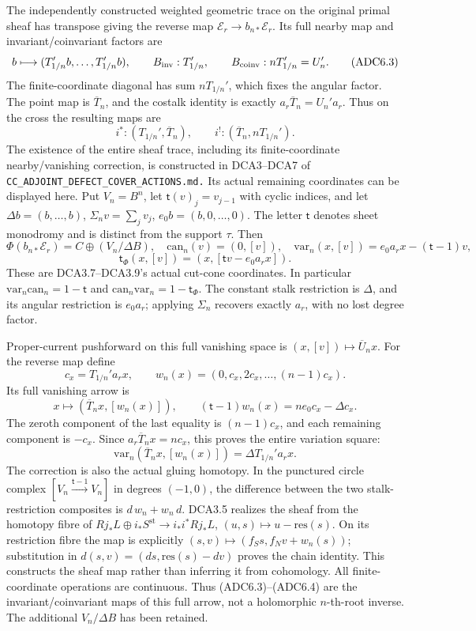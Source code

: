 The independently constructed weighted geometric trace on the original
primal sheaf has transpose giving the reverse map
\(\mathscr E_r\to b_{n*}\mathscr E_r\). Its full nearby map and
invariant/coinvariant factors are \[
b\longmapsto(T_{1/n}'b,\ldots,T_{1/n}'b),\qquad
B_{\rm inv}:T_{1/n}',\qquad B_{\rm coinv}:nT_{1/n}'=U_n'.
\tag{ADC6.3}
\] The finite-coordinate diagonal has sum \(nT_{1/n}'\), which fixes the
angular factor. The point map is \(\overline T_n\), and the costalk
identity is exactly \(a_r\overline T_n=U_n'a_r\). Thus on the cross the
resulting maps are \[
i^*: (T_{1/n}',\overline T_n),\qquad
i^!: (\overline T_n,nT_{1/n}').
\tag{ADC6.4}
\] The existence of the entire sheaf trace, including its
finite-coordinate nearby/vanishing correction, is constructed in
DCA3--DCA7 of \nolinkurl{CC_ADJOINT_DEFECT_COVER_ACTIONS.md.} Its actual
remaining coordinates can be displayed here. Put \(V_n=B^n\), let
\(\mathsf t(v)_j=v_{j-1}\) with cyclic indices, and let
\(\Delta b=(b,\ldots,b)\), \(\Sigma_n v=\sum_jv_j\),
\(e_0b=(b,0,\ldots,0)\). The letter \(\mathsf t\) denotes sheet
monodromy and is distinct from the support \(\tau\). Then \[
\Phi(b_{n*}\mathscr E_r)=C\oplus(V_n/\Delta B),\quad
\mathrm{can}_n(v)=(0,[v]),\quad
\mathrm{var}_n(x,[v])=e_0a_rx-(\mathsf t-1)v,
\] \[
\mathsf t_\Phi(x,[v])=(x,[\mathsf t v-e_0a_rx]).
\tag{ADC6.6}
\] These are DCA3.7--DCA3.9's actual cut-cone coordinates. In particular
\(\mathrm{var}_n\mathrm{can}_n=1-\mathsf t\) and
\(\mathrm{can}_n\mathrm{var}_n=1-\mathsf t_\Phi\). The constant stalk
restriction is \(\Delta\), and its angular restriction is \(e_0a_r\);
applying \(\Sigma_n\) recovers exactly \(a_r\), with no lost degree
factor.

Proper-current pushforward on this full vanishing space is
\((x,[v])\mapsto\overline U_nx\). For the reverse map define \[
c_x=T_{1/n}'a_rx,\qquad
w_n(x)=(0,c_x,2c_x,\ldots,(n-1)c_x).
\] Its full vanishing arrow is \[
x\longmapsto(\overline T_nx,[w_n(x)]),\qquad
(\mathsf t-1)w_n(x)=ne_0c_x-\Delta c_x.
\tag{ADC6.7}
\] The zeroth component of the last equality is \((n-1)c_x\), and each
remaining component is \(-c_x\). Since \(a_r\overline T_nx=nc_x\), this
proves the entire variation square: \[
\mathrm{var}_n(\overline T_nx,[w_n(x)])
=\Delta T_{1/n}'a_rx.
\tag{ADC6.8}
\] The correction is also the actual gluing homotopy. In the punctured
circle complex \([V_n\xrightarrow{\mathsf t-1}V_n]\) in degrees
\((-1,0)\), the difference between the two stalk-restriction composites
is \(d\,w_n+w_n\,d\). DCA3.5 realizes the sheaf from the homotopy fibre
of \(Rj_*L\oplus i_*S^{\mathrm{st}}\to i_*i^*Rj_*L\),
\((u,s)\mapsto u-\mathrm{res}(s)\). On its restriction fibre the map is
explicitly \((s,v)\mapsto(f_Ss,f_Nv+w_n(s))\); substitution in
\(d(s,v)=(ds,\mathrm{res}(s)-dv)\) proves the chain identity. This
constructs the sheaf map rather than inferring it from cohomology. All
finite-coordinate operations are continuous. Thus (ADC6.3)--(ADC6.4) are
the invariant/coinvariant maps of this full arrow, not a holomorphic
\(n\)-th-root inverse. The additional \(V_n/\Delta B\) has been
retained.

